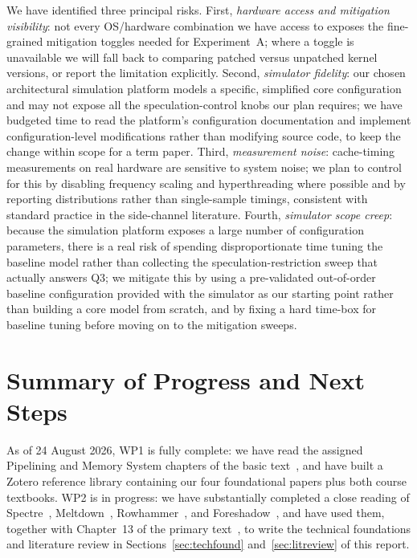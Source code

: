 \documentclass[11pt,a4paper]{article}
\begin{document}
We have identified three principal risks. First, \emph{hardware access and
mitigation visibility}: not every OS/hardware combination we have access to
exposes the fine-grained mitigation toggles needed for Experiment~A; where a
toggle is unavailable we will fall back to comparing patched versus unpatched
kernel versions, or report the limitation explicitly. Second, \emph{simulator
fidelity}: our chosen architectural simulation platform models a specific,
simplified core configuration and may not expose all the speculation-control
knobs our plan requires; we have budgeted time to read the platform's
configuration documentation and implement configuration-level modifications
rather than modifying source code, to keep the change within scope for a
term paper. Third, \emph{measurement noise}: cache-timing measurements on real
hardware are sensitive to system noise; we plan to control for this by
disabling frequency scaling and hyperthreading where possible and by
reporting distributions rather than single-sample timings, consistent with
standard practice in the side-channel literature. Fourth, \emph{simulator
scope creep}: because the simulation platform exposes a large number of configuration
parameters, there is a real risk of spending disproportionate time tuning the
baseline model rather than collecting the speculation-restriction sweep that
actually answers Q3; we mitigate this by using a pre-validated
out-of-order baseline configuration provided with the simulator
as our starting point rather than building a core model from scratch, and by fixing
a hard time-box for baseline tuning before moving on to the mitigation
sweeps.

\section{Summary of Progress and Next Steps}

As of 24 August 2026, WP1 is fully complete: we have read the assigned
Pipelining and Memory System chapters of the basic text~\cite{sarangi2025basic},
and have built a Zotero reference library containing our four foundational
papers plus both course textbooks. WP2 is in progress: we have substantially
completed a close reading of Spectre~\cite{kocher2019spectre},
Meltdown~\cite{lipp2018meltdown}, Rowhammer~\cite{kim2014rowhammer}, and
Foreshadow~\cite{vanbulck2018foreshadow}, and have used them, together with
Chapter~13 of the primary text~\cite{sarangi2023nextgen}, to write the
technical foundations and literature review in Sections~\ref{sec:techfound}
and~\ref{sec:litreview} of this report.
\end{document}
